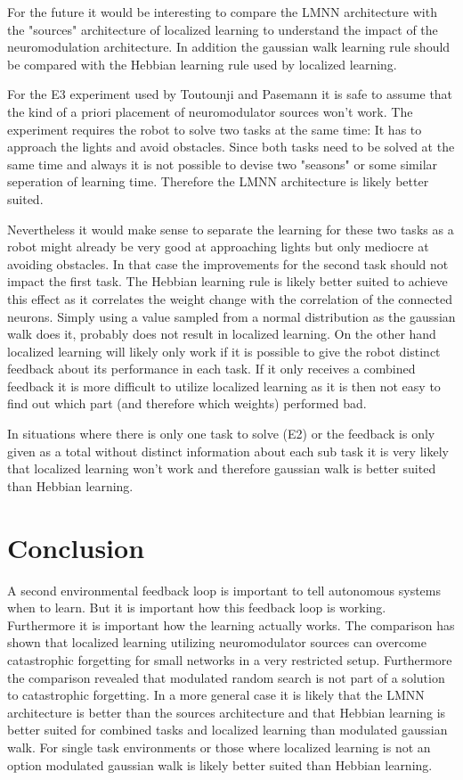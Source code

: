 \documentclass[12pt,twoside]{scrartcl}
\theoremstyle{plain}
\theoremstyle{definition}
\theoremstyle{remark}
\begin{document}
For the future it would be interesting to
compare the LMNN architecture with the "sources" architecture of localized
learning to understand the impact of the neuromodulation architecture.
In addition the gaussian walk learning rule should be compared with the
Hebbian learning rule used by localized learning.

For the E3 experiment used by Toutounji and Pasemann it is safe to assume that
the kind of a priori placement of neuromodulator sources won't work. The experiment
requires the robot to solve two tasks at the same time: It has
to approach the lights and avoid obstacles. Since both tasks need to be solved
at the same time and always it is not possible to devise two "seasons" or some
similar seperation of learning time. Therefore the LMNN architecture is likely
better suited.

Nevertheless it would make sense to separate the learning for
these two tasks as a robot might already be very good at approaching lights but
only mediocre at avoiding obstacles. In that case the improvements for the second
task should not impact the first task. The Hebbian learning rule is likely
better suited to achieve this effect as it correlates the weight change with
the correlation of the connected neurons. Simply using a value sampled from a
normal distribution as the gaussian walk does it, probably does not result in
localized learning. On the other hand localized learning will likely only work
if it is possible to give the robot distinct feedback about its performance in
each task. If it only receives a combined feedback it is more difficult to
utilize localized learning as it is then not easy to find out which part (and
therefore which weights) performed bad.

In situations where there is only one task to solve (E2) or the feedback is only
given as a total without distinct information about each sub task it is very
likely that localized learning won't work and therefore gaussian walk is better
suited than Hebbian learning.

\section{Conclusion}
\label{sec:concl}

A second environmental feedback loop is important to tell autonomous systems
when to learn. But it is important how this feedback loop is working. Furthermore
it is important how the learning actually works. The comparison has shown that
localized learning utilizing neuromodulator sources can overcome catastrophic
forgetting for small networks in a very restricted setup. Furthermore the
comparison revealed that modulated random search is not part of a solution to
catastrophic forgetting. In a more general case it is likely that the LMNN
architecture is better than the sources architecture and that Hebbian learning
is better suited for combined tasks and localized learning than modulated gaussian
walk. For single task environments or those where localized learning is not an
option modulated gaussian walk is likely better suited than Hebbian learning.
\end{document}
